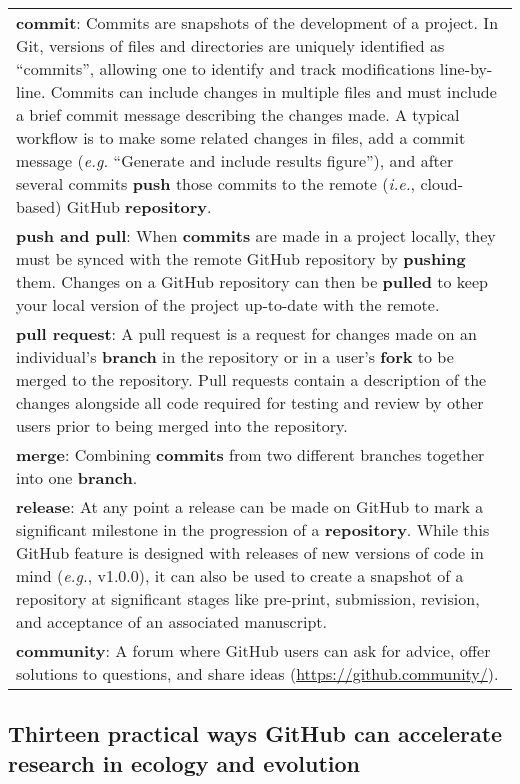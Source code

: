 \begin{tablenos:no-prefix-table-caption}
\begin{longtable}[]{@{}
  >{\raggedright\arraybackslash}p{}@{}}
\textbf{commit}: Commits are snapshots of the development of a project. In Git, versions of files and directories are uniquely identified as ``commits'', allowing one to identify and track modifications line-by-line. Commits can include changes in multiple files and must include a brief commit message describing the changes made. A typical workflow is to make some related changes in files, add a commit message (\emph{e.g.} ``Generate and include results figure''), and after several commits \textbf{push} those commits to the remote (\emph{i.e.}, cloud-based) GitHub \textbf{repository}. \\
\textbf{push and pull}: When \textbf{commits} are made in a project locally, they must be synced with the remote GitHub repository by \textbf{pushing} them. Changes on a GitHub repository can then be \textbf{pulled} to keep your local version of the project up-to-date with the remote. \\
\textbf{pull request}: A pull request is a request for changes made on an individual's \textbf{branch} in the repository or in a user's \textbf{fork} to be merged to the repository. Pull requests contain a description of the changes alongside all code required for testing and review by other users prior to being merged into the repository. \\
\textbf{merge}: Combining \textbf{commits} from two different branches together into one \textbf{branch}. \\
\textbf{release}: At any point a release can be made on GitHub to mark a significant milestone in the progression of a \textbf{repository}. While this GitHub feature is designed with releases of new versions of code in mind (\emph{e.g.}, v1.0.0), it can also be used to create a snapshot of a repository at significant stages like pre-print, submission, revision, and acceptance of an associated manuscript. \\
\textbf{community}: A forum where GitHub users can ask for advice, offer solutions to questions, and share ideas (\url{https://github.community/}). \\
\bottomrule
\end{longtable}

\end{tablenos:no-prefix-table-caption}

\hypertarget{thirteen-practical-ways-github-can-accelerate-research-in-ecology-and-evolution}{%
\subsection{Thirteen practical ways GitHub can accelerate research in ecology and evolution}\label{thirteen-practical-ways-github-can-accelerate-research-in-ecology-and-evolution}}

